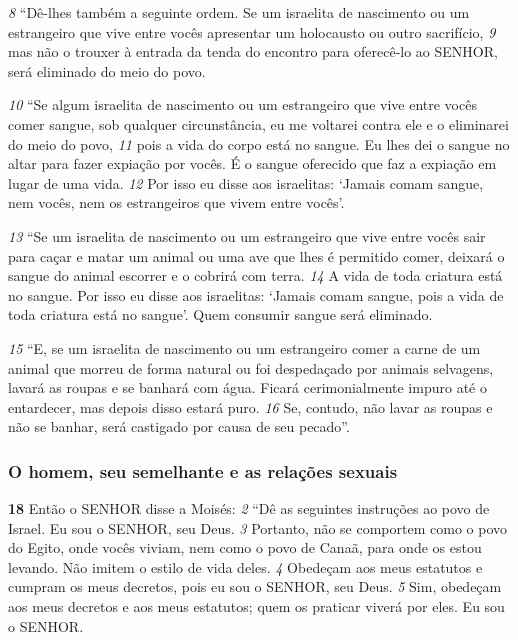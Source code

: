 \smallskip
\textit{\tiny 8} 
“Dê-lhes também a seguinte ordem. Se um israelita de nascimento ou um
estrangeiro que vive entre vocês apresentar um holocausto ou outro sacrifício, 
\textit{\tiny 9} 
mas não o trouxer à entrada da tenda do encontro para oferecê-lo ao SENHOR,
será eliminado do meio do povo.
   
\smallskip
\textit{\tiny 10}
“Se algum israelita de nascimento ou um estrangeiro que vive entre vocês
comer sangue, sob qualquer circunstância, eu me voltarei contra ele e o eliminarei
do meio do povo, 
\textit{\tiny 11}
pois a vida do corpo está no sangue. Eu lhes dei o sangue no
altar para fazer expiação por vocês. É o sangue oferecido que faz a expiação em
lugar de uma vida. 
\textit{\tiny 12}
Por isso eu disse aos israelitas: ‘Jamais comam sangue, nem
vocês, nem os estrangeiros que vivem entre vocês’.
   
\smallskip
\textit{\tiny 13}
“Se um israelita de nascimento ou um estrangeiro que vive entre vocês sair
para caçar e matar um animal ou uma ave que lhes é permitido comer, deixará o
sangue do animal escorrer e o cobrirá com terra. 
\textit{\tiny 14}
A vida de toda criatura está no
sangue. Por isso eu disse aos israelitas: ‘Jamais comam sangue, pois a vida de toda
criatura está no sangue’. Quem consumir sangue será eliminado.
   
\smallskip
\textit{\tiny 15}
“E, se um israelita de nascimento ou um estrangeiro comer a carne de um
animal que morreu de forma natural ou foi despedaçado por animais selvagens,
lavará as roupas e se banhará com água. Ficará cerimonialmente impuro até o
entardecer, mas depois disso estará puro. 
\textit{\tiny 16}
Se, contudo, não lavar as roupas e não
se banhar, será castigado por causa de seu pecado”.

\bigskip
\subsubsection*{O homem, seu semelhante e as relações sexuais}
   
\textbf{\large 18}
 Então o SENHOR disse a Moisés: 
\textit{\tiny 2} 
“Dê as seguintes instruções ao povo de
Israel. Eu sou o SENHOR, seu Deus. 
\textit{\tiny 3} 
Portanto, não se comportem como o povo do
Egito, onde vocês viviam, nem como o povo de Canaã, para onde os estou levando.
Não imitem o estilo de vida deles. 
\textit{\tiny 4} 
Obedeçam aos meus estatutos e cumpram os
meus decretos, pois eu sou o SENHOR, seu Deus. 
\textit{\tiny 5} 
Sim, obedeçam aos meus
decretos e aos meus estatutos; quem os praticar viverá por eles. Eu sou o SENHOR. 

